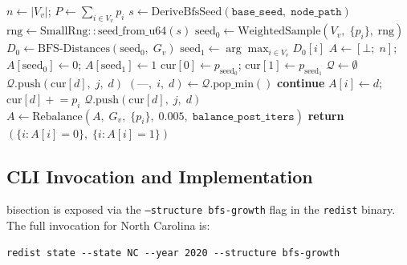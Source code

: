 \begin{algorithm}[t]
\caption{\bfsg{}-\textsc{Bisect}($G_v$, $\mathtt{base\_seed}$, $\mathtt{node\_path}$, $\mathtt{balance\_post\_iters}$)}
\label{alg:bfs}
\begin{algorithmic}[1]
\State $n \gets |V_v|$; \quad $P \gets \sum_{i \in V_v} p_i$ 
\State $s \gets \mathrm{DeriveBfsSeed}(\mathtt{base\_seed},\; \mathtt{node\_path})$ 
\State $\mathrm{rng} \gets \mathrm{SmallRng::seed\_from\_u64}(s)$
\State $\mathrm{seed}_0 \gets \mathrm{WeightedSample}(V_v,\; \{p_i\},\; \mathrm{rng})$
\State $D_0 \gets \mathrm{BFS\text{-}Distances}(\mathrm{seed}_0,\; G_v)$
\State $\mathrm{seed}_1 \gets \arg\max_{i \in V_v} D_0[i]$
\State $A \gets [\bot;\; n]$; \quad
       $A[\mathrm{seed}_0] \gets 0$; \quad $A[\mathrm{seed}_1] \gets 1$
\State $\mathrm{cur}[0] \gets p_{\mathrm{seed}_0}$; \quad
       $\mathrm{cur}[1] \gets p_{\mathrm{seed}_1}$
\State $\mathcal{Q} \gets \emptyset$ 
      \State $\mathcal{Q}.\mathrm{push}(\mathrm{cur}[d],\; j,\; d)$
    \EndIf
  \EndFor
\EndFor
{}
  \State $(\text{---},\; i,\; d) \gets \mathcal{Q}.\mathrm{pop\_min}()$
   \textbf{continue} \EndIf {}
  \State $A[i] \gets d$; \quad $\mathrm{cur}[d] \mathrel{+}= p_i$
      \State $\mathcal{Q}.\mathrm{push}(\mathrm{cur}[d],\; j,\; d)$
    \EndIf
  \EndFor
\EndWhile
\State $A \gets \mathrm{Rebalance}(A,\; G_v,\; \{p_i\},\; 0.005,\; \mathtt{balance\_post\_iters})$
\State \textbf{return} $(\{i : A[i] = 0\},\; \{i : A[i] = 1\})$
\end{algorithmic}
\end{algorithm}

\subsection{CLI Invocation and Implementation}

\bfsg{} bisection is exposed via the \texttt{--structure bfs-growth}
flag in the \texttt{redist} binary.
The full invocation for North Carolina is:

\begin{verbatim}
redist state --state NC --year 2020 --structure bfs-growth
\end{verbatim}


